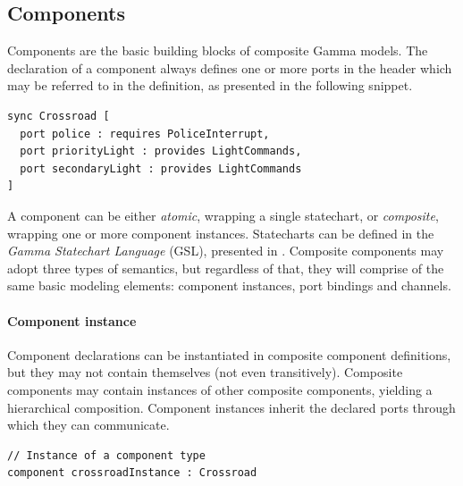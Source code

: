 \subsection{Components}
Components are the basic building blocks of composite Gamma models. The declaration of a component always defines one or more ports in the header which may be referred to in the definition, as presented in the following snippet.
\begin{lstlisting}
sync Crossroad [
  port police : requires PoliceInterrupt,
  port priorityLight : provides LightCommands,
  port secondaryLight : provides LightCommands
]
\end{lstlisting}

A component can be either \emph{atomic}, wrapping a single statechart, or \emph{composite}, wrapping one or more component instances. Statecharts can be defined in the \emph{Gamma Statechart Language} (GSL), presented in \cite{graics-bence-bsc}. Composite components may adopt three types of semantics, but regardless of that, they will comprise of the same basic modeling elements: component instances, port bindings and channels.

\paragraph{Component instance} Component declarations can be instantiated in composite component definitions, but they may not contain themselves (not even transitively). Composite components may contain instances of other composite components, yielding a hierarchical composition.
Component instances inherit the declared ports through which they can communicate.

\begin{lstlisting}
// Instance of a component type
component crossroadInstance : Crossroad
\end{lstlisting}

